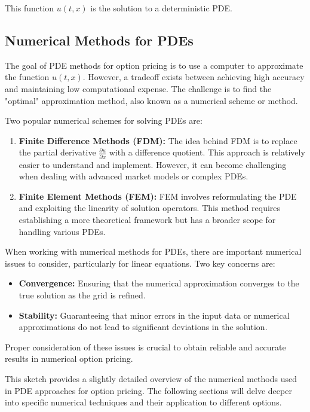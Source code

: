 This function $u(t, x)$ is the solution to a deterministic PDE.

\subsection{Numerical Methods for PDEs}

The goal of PDE methods for option pricing is to use a computer to approximate the function $u(t, x)$. However, a tradeoff exists between achieving high accuracy and maintaining low computational expense. The challenge is to find the "optimal" approximation method, also known as a numerical scheme or method.

Two popular numerical schemes for solving PDEs are:
\begin{enumerate}
    \item \textbf{Finite Difference Methods (FDM):} The idea behind FDM is to replace the partial derivative $\frac{\partial u}{\partial x}$ with a difference quotient. This approach is relatively easier to understand and implement. However, it can become challenging when dealing with advanced market models or complex PDEs.
    
    \item \textbf{Finite Element Methods (FEM):} FEM involves reformulating the PDE and exploiting the linearity of solution operators. This method requires establishing a more theoretical framework but has a broader scope for handling various PDEs.
\end{enumerate}

When working with numerical methods for PDEs, there are important numerical issues to consider, particularly for linear equations. Two key concerns are:
\begin{itemize}
    \item \textbf{Convergence:} Ensuring that the numerical approximation converges to the true solution as the grid is refined.
    
    \item \textbf{Stability:} Guaranteeing that minor errors in the input data or numerical approximations do not lead to significant deviations in the solution.
\end{itemize}

Proper consideration of these issues is crucial to obtain reliable and accurate results in numerical option pricing.

This sketch provides a slightly detailed overview of the numerical methods used in PDE approaches for option pricing. The following sections will delve deeper into specific numerical techniques and their application to different options.


